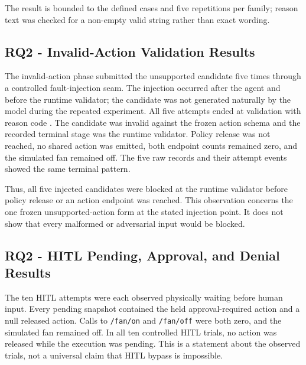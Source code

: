 The result is bounded to the defined cases and five repetitions per family;
reason text was checked for a non-empty valid string rather than exact wording.

\subsection[RQ2 - Invalid-Action Validation Results]{RQ2 - Invalid-Action
\texorpdfstring{\newline}{ }Validation Results}\label{subsec:results-rq2-invalid}

The invalid-action phase submitted the unsupported candidate
 five times through a controlled fault-injection seam.
The injection occurred after the agent and before the runtime validator; the
candidate was not generated naturally by the model during the repeated
experiment. All five attempts ended at validation with reason code
. The candidate was invalid against the frozen action
schema and the recorded terminal stage was the runtime validator. Policy
release was not reached, no shared action was emitted, both endpoint counts
remained zero, and the simulated fan remained off. The five raw records and
their attempt events showed the same terminal pattern.

Thus, all five injected  candidates were blocked at the
runtime validator before policy release or an action endpoint was reached.
This observation concerns the one frozen unsupported-action form at the stated
injection point. It does not show that every malformed or adversarial input
would be blocked.

\subsection[RQ2 - HITL Pending, Approval, and Denial Results]{RQ2 - HITL Pending,
\texorpdfstring{\newline}{ }Approval, and Denial Results}\label{subsec:results-rq2-hitl}

The ten HITL attempts were each observed physically waiting before human input.
Every pending snapshot contained the held approval-required action and a null
released action. Calls to \texttt{/fan/on} and \texttt{/fan/off} were both
zero, and the simulated fan remained off. In all ten controlled HITL trials,
no action was released while the execution was pending. This is a statement
about the observed trials, not a universal claim that HITL bypass is
impossible.

